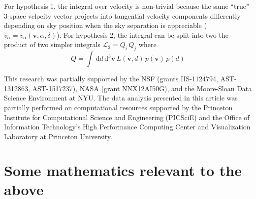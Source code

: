 \documentclass[manuscript, letterpaper]{aastex6}
\newcommand{\project}[1]{\textsl{#1}}
\newcommand{\acronym}[1]{{\small{#1}}}
\newcommand{\apogee}{\project{\acronym{APOGEE}}}
\newcommand{\dd}{\mathrm{d}}
\newcommand{\bs}[1]{\boldsymbol{#1}}
\begin{document}
For hypothesis 1, the integral over velocity is non-trivial because the same
``true'' 3-space velocity vector projects into tangential velocity components
differently depending on sky position when the sky separation is appreciable
($v_\alpha = v_\alpha(\bs{v}, \alpha, \delta)$). For hypothesis 2, the integral
can be split into two the product of two simpler integrals $\mathcal{L}_2 = Q_i
\, Q_j$ where
\begin{equation}
  Q = \int \, \dd d \, \dd^3 \bs{v} \, L(\bs{v}, d) \, p(\bs{v}) \, p(d)
\end{equation}

\acknowledgements

This research was partially supported by the \acronym{NSF} (grants
  \acronym{IIS-1124794}, \acronym{AST-1312863}, \acronym{AST-1517237}),
  \acronym{NASA} (grant \acronym{NNX12AI50G}),
  and the Moore-Sloan Data Science Environment at \acronym{NYU}. The data
analysis presented in this article was partially performed on computational
resources supported by the Princeton Institute for Computational Science and
Engineering (PICSciE) and the Office of Information Technology's High
Performance Computing Center and Visualization Laboratory at Princeton
University.






\appendix
\section{Some mathematics relevant to the above}
\end{document}
